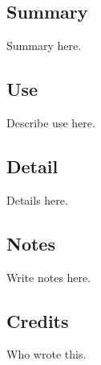 
\subsection{Summary}

Summary here.


\subsection{Use}

Describe use here.


\subsection{Detail}

Details here.


\subsection{Notes}

Write notes here.


\subsection{Credits}

Who wrote this.
